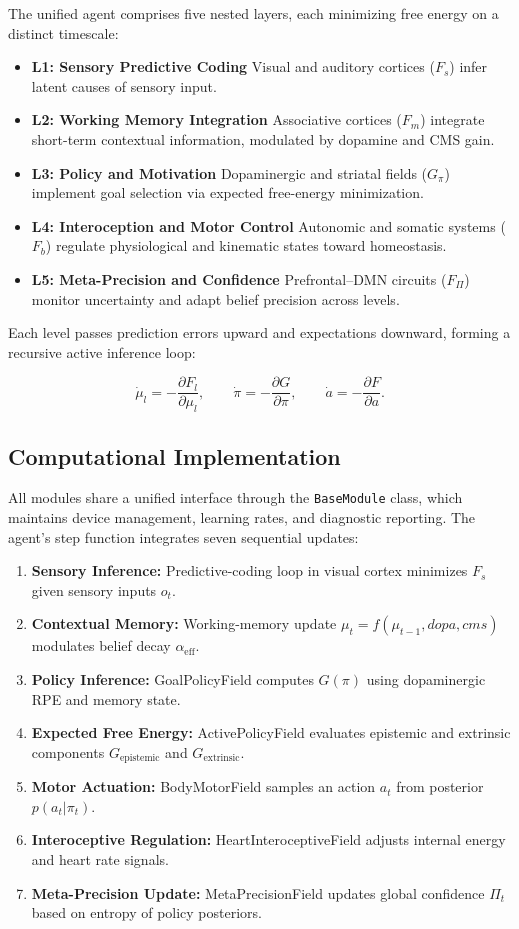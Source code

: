 \documentclass[9pt]{elife}
\begin{document}
The unified agent comprises five nested layers, each minimizing
free energy on a distinct timescale:

\begin{itemize}
\item \textbf{L1: Sensory Predictive Coding}  
Visual and auditory cortices ($F_s$) infer latent causes of sensory input.
\item \textbf{L2: Working Memory Integration}  
Associative cortices ($F_m$) integrate short-term contextual information,
modulated by dopamine and CMS gain.
\item \textbf{L3: Policy and Motivation}  
Dopaminergic and striatal fields ($G_\pi$) implement goal selection via
expected free-energy minimization.
\item \textbf{L4: Interoception and Motor Control}  
Autonomic and somatic systems ($F_b$) regulate physiological and
kinematic states toward homeostasis.
\item \textbf{L5: Meta-Precision and Confidence}  
Prefrontal–DMN circuits ($F_\Pi$) monitor uncertainty and adapt belief
precision across levels.
\end{itemize}

Each level passes prediction errors upward and expectations downward,
forming a recursive active inference loop:

\[
\dot{\mu}_l = -\frac{\partial F_l}{\partial \mu_l}, \qquad
\dot{\pi} = -\frac{\partial G}{\partial \pi}, \qquad
\dot{a} = -\frac{\partial F}{\partial a}.
\]

\subsection{Computational Implementation}

All modules share a unified interface through the \texttt{BaseModule} class,
which maintains device management, learning rates, and diagnostic reporting.
The agent’s step function integrates seven sequential updates:

\begin{enumerate}
\item \textbf{Sensory Inference:}  
Predictive-coding loop in visual cortex minimizes $F_s$ given sensory inputs $o_t$.
\item \textbf{Contextual Memory:}  
Working-memory update $\mu_t = f(\mu_{t-1}, dopa, cms)$ modulates belief decay $\alpha_{\mathrm{eff}}$.
\item \textbf{Policy Inference:}  
GoalPolicyField computes $G(\pi)$ using dopaminergic RPE and memory state.
\item \textbf{Expected Free Energy:}  
ActivePolicyField evaluates epistemic and extrinsic components
$G_{\text{epistemic}}$ and $G_{\text{extrinsic}}$.
\item \textbf{Motor Actuation:}  
BodyMotorField samples an action $a_t$ from posterior $p(a_t|\pi_t)$.
\item \textbf{Interoceptive Regulation:}  
HeartInteroceptiveField adjusts internal energy and heart rate signals.
\item \textbf{Meta-Precision Update:}  
MetaPrecisionField updates global confidence $\Pi_t$ based on entropy of policy posteriors.
\end{enumerate}
\end{document}
